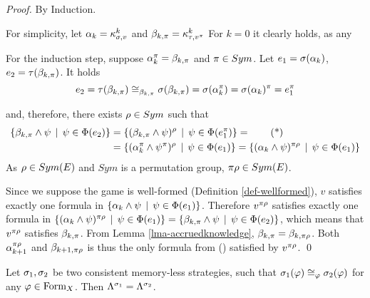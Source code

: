 \begin{proof}
By Induction.

For simplicity, let
  $\alpha_k = \kappa_{\sigma, v}^{k}$ and
  $\beta_{k, \pi} = \kappa_{\tau, v^\pi}^{k}$
For $k=0$ it clearly holds, as any 

For the induction step, suppose $\alpha_k^\pi = \beta_{k, \pi}$ and $\pi\in Sym$.
Let $e_1 = \sigma(\alpha_k)$, $e_2 = \tau(\beta_{k, \pi})$. It holds
\[
e_2 = \tau(\beta_{k, \pi})
    \cong_{\beta_{k, \pi}}   \sigma(\beta_{k, \pi})
    = \sigma(\alpha_k^\pi)
    = \sigma(\alpha_k)^\pi
    = e_1^\pi
\]

and, therefore, there exists $\rho\in Sym$ such that
\begin{align}
 \{ \beta_{k, \pi} \wedge \psi \:\:|\:\: \psi\in\Phi(e_2) \} &=
 \{ (\beta_{k, \pi} \wedge \psi)^\rho \:\:|\:\: \psi\in\Phi(e_1^\pi) \} = \label{eq:sets}\tag{*}\\
&= \{ (\alpha_k^\pi \wedge \psi^\pi)^\rho \:\:|\:\: \psi\in\Phi(e_1) \} =
 \{ (\alpha_k \wedge \psi)^{\pi\rho} \:\:|\:\: \psi\in\Phi(e_1) \}
\end{align}
As $\rho\in Sym(E)$ and $Sym$ is a permutation group, $\pi\rho\in Sym(E)$.

Since we suppose the game is well-formed (Definition \ref{def-wellformed}),
  $v$ satisfies exactly one formula in
  $\{ \alpha_k \wedge \psi \:\:|\:\: \psi\in\Phi(e_1) \}$.
Therefore $v^{\pi\rho}$ satisfies exactly one formula
  in
  $\{ (\alpha_k \wedge \psi)^{\pi\rho} \:\:|\:\: \psi\in\Phi(e_1) \}  =
   \{ \beta_{k, \pi} \wedge \psi \:\:|\:\: \psi\in\Phi(e_2) \}$,
  which means that $v^{\pi\rho}$ satisfies $\beta_{k, \pi}$.
From Lemma \ref{lma-accruedknowledge}, $\beta_{k, \pi} = \beta_{k, \pi\rho}$.
Both $\alpha_{k+1}^{\pi\rho}$ and $\beta_{k+1, \pi\rho}$ is thus the only
  formula from () satisfied by $v^{\pi\rho}$. \qed
\end{proof}

\begin{corollary}
Let $\sigma_1, \sigma_2$ be two consistent memory-less strategies, such that
$\sigma_1(\varphi) \cong_{\varphi} \sigma_2(\varphi)$ for any $\varphi\in\textrm{Form}_X$.
Then $\Lambda^{\sigma_1} = \Lambda^{\sigma_2}$.
\end{corollary}


